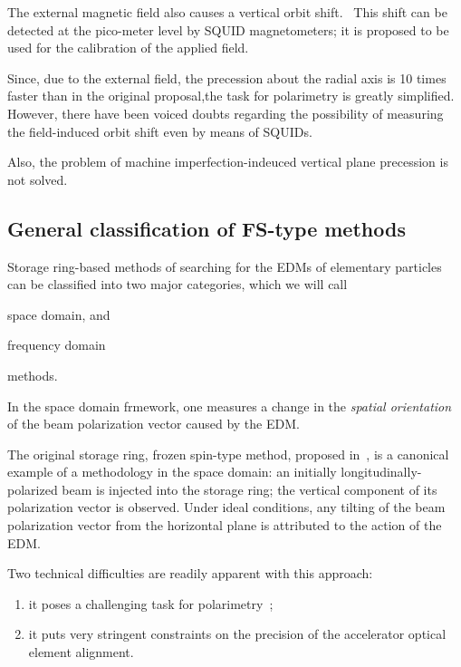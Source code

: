 The external magnetic field also causes a vertical orbit shift.~\cite[p.~1963]{Koop:SpinWheel}
This shift can be detected at the pico-meter level by SQUID magnetometers; it is proposed to be used
for the calibration of the applied field.

Since, due to the external field, the precession about the radial axis is 10
times faster than in the original proposal,the task for polarimetry is greatly
simplified. However, there have been voiced doubts regarding the possibility of
measuring the field-induced orbit shift even by means of SQUIDs.

Also, the problem of machine imperfection-indeuced vertical plane precession is not solved.

\subsection{General classification of FS-type methods}
Storage ring-based methods of searching for the EDMs of elementary particles
can be classified into two major categories, which we will call
\begin{inparaenum}
\item space domain, and %
\item frequency domain %
\end{inparaenum}
methods.

In the space domain frmework, one measures a change in the \emph{spatial orientation} of the beam polarization
vector caused by the EDM.

The original storage ring, frozen spin-type method, proposed in~\cite{BNL:Deuteron2008}, is a canonical example of
a methodology in the space domain: an initially longitudinally-polarized beam is injected into the storage ring;
the vertical component of its polarization vector is observed. Under ideal conditions, any tilting of
the beam polarization vector from the horizontal plane is attributed to the action of the EDM.

Two technical difficulties are readily apparent with this approach:
\begin{enumerate}
\item it poses a challenging task for polarimetry~\cite{Mane:SpinWheel};
\item it puts very stringent constraints on the precision of the accelerator optical element alignment.
\end{enumerate}

